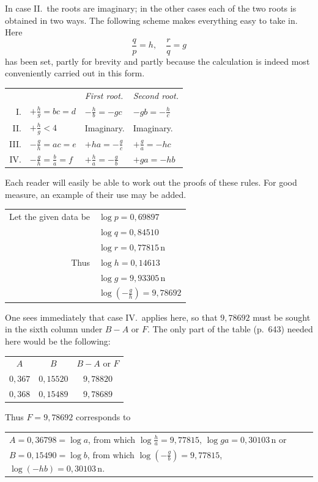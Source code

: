 In case II.\ the roots are imaginary; in the other cases each of the two roots is obtained in two ways. The following scheme makes everything easy to take in. Here
\[
\frac{q}{p}=h,\quad \frac{r}{q}=g
\]
has been set, partly for brevity and partly because the calculation is indeed most conveniently carried out in this form.

\begin{center}
\begingroup\renewcommand{\arraystretch}{1.7}\begin{tabular}{rlll}
 & & \emph{First root.} & \emph{Second root.} \\
I. & $+\frac{h}{g}=bc=d$ & $-\frac{h}{b}=-gc$ & $-gb=-\frac{h}{c}$ \\
II. & $+\frac{h}{g}<4$ & Imaginary. & Imaginary. \\
III. & $-\frac{g}{h}=ac=e$ & $+ha=-\frac{g}{c}$ & $+\frac{g}{a}=-hc$ \\
IV. & $-\frac{g}{h}=\frac{b}{a}=f$ & $+\frac{h}{a}=-\frac{g}{b}$ & $+ga=-hb$
\end{tabular}\endgroup
\end{center}
\par
{}
Each reader will easily be able to work out the proofs of these rules. For good measure, an example of their use may be added.

\begin{center}
\begin{tabular}{rl}
Let the given data be & $\log p=0{,}69897$ \\
 & $\log q=0{,}84510$ \\
 & $\log r=0{,}77815\,\mathrm{n}$ \\
Thus & $\log h=0{,}14613$ \\
 & $\log g=9{,}93305\,\mathrm{n}$ \\
 & $\log(-\frac{g}{h})=9{,}78692$
\end{tabular}
\end{center}

One sees immediately that case IV.\ applies here, so that $9{,}78692$ must be sought in the sixth column under $B-A$ or $F$. The only part of the table (p.\ 643) needed here would be the following:
\begin{center}
\begin{tabular}{c|c|c}
$A$ & $B$ & $B-A$ or $F$ \\
$0{,}367$ & $0{,}15520$ & $9{,}78820$ \\
$0{,}368$ & $0{,}15489$ & $9{,}78689$
\end{tabular}
\end{center}
Thus $F=9{,}78692$ corresponds to
\begin{center}
\begingroup\setlength{\tabcolsep}{3pt}\begin{tabular}{l}
$A=0{,}36798=\log a$, from which $\log\frac{h}{a}=9{,}77815$, $\log ga=0{,}30103\,\mathrm{n}$ or \\
$B=0{,}15490=\log b$, from which $\log(-\frac{g}{b})=9{,}77815$, $\log(-hb)=0{,}30103\,\mathrm{n}$.
\end{tabular}\endgroup
\end{center}

